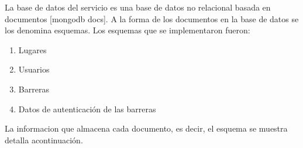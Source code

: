 La base de datos del servicio es una base de datos no relacional basada en documentos [mongodb docs]. A la forma de los documentos en la base de datos se los denomina esquemas. Los esquemas que se implementaron fueron:

\begin{enumerate}
    \item Lugares
    \item Usuarios
    \item Barreras
    \item Datos de autenticación de las barreras
\end{enumerate}

La informacion que almacena cada documento, es decir, el esquema se muestra detalla acontinuación.




